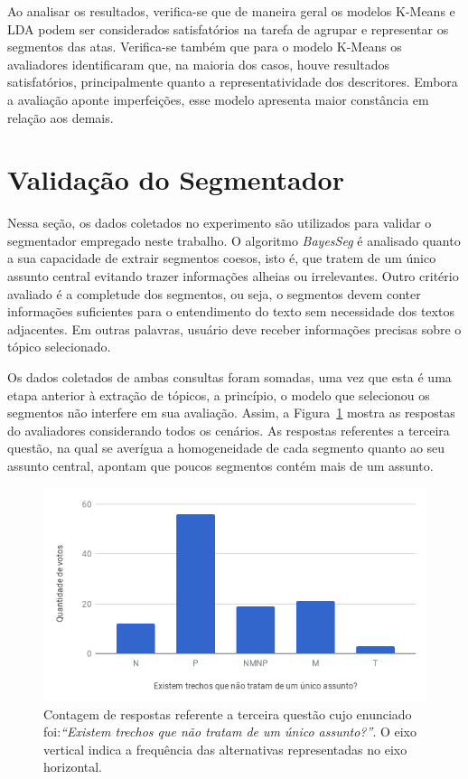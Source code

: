 Ao analisar os resultados, verifica-se que de maneira geral os modelos K-Means e LDA podem ser considerados satisfatórios na tarefa de agrupar e representar os segmentos das atas.
Verifica-se também que para o modelo K-Means os avaliadores identificaram que, na maioria dos casos, houve resultados satisfatórios, principalmente quanto a representatividade dos descritores. Embora a avaliação aponte imperfeições, esse modelo apresenta maior 
constância em relação aos demais.

\section{Validação do Segmentador}

Nessa seção, os dados coletados no experimento são utilizados para validar o segmentador empregado neste trabalho. O algoritmo \textit{BayesSeg} é analisado quanto a sua capacidade de extrair segmentos coesos, isto é, que tratem de um único assunto central evitando trazer informações alheias ou irrelevantes. Outro critério avaliado é a completude dos segmentos, ou seja, o segmentos devem conter informações suficientes para o entendimento do texto sem necessidade dos textos adjacentes. Em outras palavras, usuário deve receber informações precisas sobre o tópico selecionado.

Os dados coletados de ambas consultas foram somadas, uma vez que esta é uma etapa anterior à extração de tópicos, a princípio, o modelo que selecionou os segmentos não interfere em sua avaliação. Assim, a Figura~\ref{fig:Q3} mostra as respostas do avaliadores considerando todos os cenários. As respostas referentes a terceira questão, na qual se averígua a homogeneidade de cada segmento quanto ao seu assunto central, apontam que poucos segmentos contém mais de um assunto.

\begin{figure}[!h] \centering     %

		\includegraphics[width=.48\textwidth]{conteudo/capitulos/figs/figuras-experimento/Q3-Seg.png}
	\caption{Contagem de respostas referente a terceira questão cujo enunciado foi:\textit{``Existem trechos que não tratam de um único assunto?''}. O eixo vertical indica a frequência das alternativas representadas no eixo horizontal. }
	\label{fig:Q3}
\end{figure}


